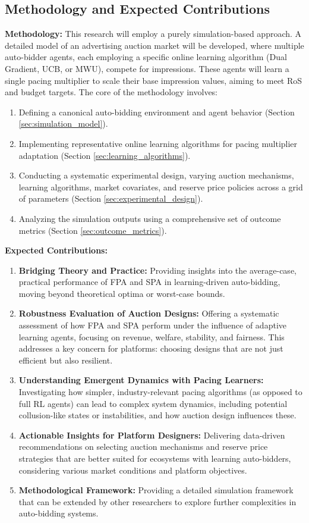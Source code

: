 \documentclass[12pt, a4paper]{article}
\begin{document}
\subsection{Methodology and Expected Contributions}
\textbf{Methodology:}
This research will employ a purely simulation-based approach. A detailed model of an advertising auction market will be developed, where multiple auto-bidder agents, each employing a specific online learning algorithm (Dual Gradient, UCB, or MWU), compete for impressions. These agents will learn a single pacing multiplier to scale their base impression values, aiming to meet RoS and budget targets. The core of the methodology involves:
\begin{enumerate}
    \item Defining a canonical auto-bidding environment and agent behavior (Section \ref{sec:simulation_model}).
    \item Implementing representative online learning algorithms for pacing multiplier adaptation (Section \ref{sec:learning_algorithms}).
    \item Conducting a systematic experimental design, varying auction mechanisms, learning algorithms, market covariates, and reserve price policies across a grid of parameters (Section \ref{sec:experimental_design}).
    \item Analyzing the simulation outputs using a comprehensive set of outcome metrics (Section \ref{sec:outcome_metrics}).
\end{enumerate}

\textbf{Expected Contributions:}
\begin{enumerate}
    \item \textbf{Bridging Theory and Practice:} Providing insights into the average-case, practical performance of FPA and SPA in learning-driven auto-bidding, moving beyond theoretical optima or worst-case bounds.
    \item \textbf{Robustness Evaluation of Auction Designs:} Offering a systematic assessment of how FPA and SPA perform under the influence of adaptive learning agents, focusing on revenue, welfare, stability, and fairness. This addresses a key concern for platforms: choosing designs that are not just efficient but also resilient.
    \item \textbf{Understanding Emergent Dynamics with Pacing Learners:} Investigating how simpler, industry-relevant pacing algorithms (as opposed to full RL agents) can lead to complex system dynamics, including potential collusion-like states or instabilities, and how auction design influences these.
    \item \textbf{Actionable Insights for Platform Designers:} Delivering data-driven recommendations on selecting auction mechanisms and reserve price strategies that are better suited for ecosystems with learning auto-bidders, considering various market conditions and platform objectives.
    \item \textbf{Methodological Framework:} Providing a detailed simulation framework that can be extended by other researchers to explore further complexities in auto-bidding systems.
\end{enumerate}
\end{document}
